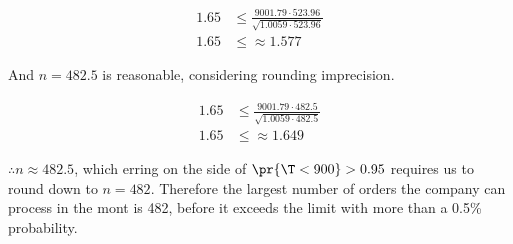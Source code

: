 \begin{align*}
1.65 &\leq \frac{900  1.79 \cdot 523.96}{\sqrt{1.0059\cdot523.96}} \\
1.65 &\leq \approx 1.577
\end{align*}

And $n = 482.5$ is reasonable, considering rounding imprecision.

\begin{align*}
1.65 &\leq \frac{900  1.79 \cdot 482.5}{\sqrt{1.0059\cdot482.5}} \\
1.65 &\leq \approx 1.649
\end{align*}

$\therefore n \approx 482.5$, which erring on the side of $\pr{\T < 900} > 0.95$ requires
us to round down to $n = 482$.
Therefore the largest number of orders the company can process in the mont is 482,
before it exceeds the limit with more than a 0.5\% probability.
